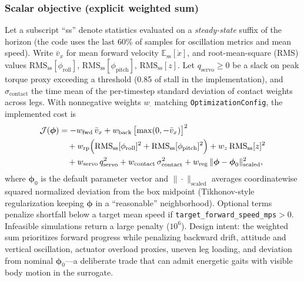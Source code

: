 \documentclass[11pt]{article}
\begin{document}
\subsubsection{Scalar objective (explicit weighted sum)}
Let a subscript ``ss'' denote statistics evaluated on a \emph{steady-state} suffix of the horizon (the code uses the last 60\% of samples for oscillation metrics and mean speed). Write $\bar{v}_{x}$ for mean forward velocity $\mathbb{E}_{\mathrm{ss}}[\dot{x}]$, and root-mean-square (RMS) values $\mathrm{RMS}_{\mathrm{ss}}[\phi_{\mathrm{roll}}]$, $\mathrm{RMS}_{\mathrm{ss}}[\phi_{\mathrm{pitch}}]$, $\mathrm{RMS}_{\mathrm{ss}}[z]$. Let $q_{\mathrm{servo}}\ge 0$ be a slack on peak torque proxy exceeding a threshold (0.85 of stall in the implementation), and $\sigma_{\mathrm{contact}}$ the time mean of the per-timestep standard deviation of contact weights across legs. With nonnegative weights $w_{\cdot}$ matching \texttt{OptimizationConfig}, the implemented cost is
\begin{equation}
  \begin{aligned}
  \mathcal{J}(\boldsymbol{\phi}) &=
    -w_{\mathrm{fwd}}\,\bar{v}_{x}
    + w_{\mathrm{back}}\,\bigl[\max(0,-\bar{v}_{x})\bigr]^2 \\
  &\quad
    + w_{\mathrm{rp}}\Bigl(
        \mathrm{RMS}_{\mathrm{ss}}[\phi_{\mathrm{roll}}]^2
      + \mathrm{RMS}_{\mathrm{ss}}[\phi_{\mathrm{pitch}}]^2
      \Bigr)
    + w_{z}\,\mathrm{RMS}_{\mathrm{ss}}[z]^2 \\
  &\quad
    + w_{\mathrm{servo}}\,q_{\mathrm{servo}}^2
    + w_{\mathrm{contact}}\,\sigma_{\mathrm{contact}}^2
    + w_{\mathrm{reg}}\,\|\boldsymbol{\phi}-\boldsymbol{\phi}_{0}\|_{\mathrm{scaled}}^2 ,
  \end{aligned}
  \label{eq:surrogate-cost}
\end{equation}
where $\boldsymbol{\phi}_{0}$ is the default parameter vector and $\|\cdot\|_{\mathrm{scaled}}$ averages coordinatewise squared normalized deviation from the box midpoint (Tikhonov-style regularization keeping $\boldsymbol{\phi}$ in a ``reasonable'' neighborhood). Optional terms penalize shortfall below a target mean speed if \texttt{target\_forward\_speed\_mps}${}>0$. Infeasible simulations return a large penalty ($10^6$). Design intent: the weighted sum prioritizes forward progress while penalizing backward drift, attitude and vertical oscillation, actuator overload proxies, uneven leg loading, and deviation from nominal $\boldsymbol{\phi}_{0}$---a deliberate trade that can admit energetic gaits with visible body motion in the surrogate.
\end{document}
